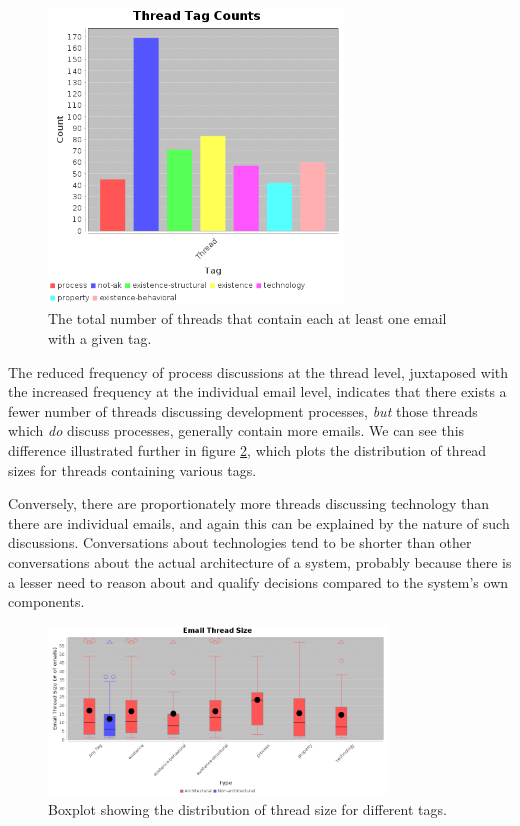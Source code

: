 \documentclass[a4paper, 12pt]{article}
\begin{document}
		\begin{figure}[H]
			\centering
			\includegraphics[width=0.7\textwidth]{report/overview/thread_tag_count.png}
			\caption{The total number of threads that contain each at least one email with a given tag.}
			\label{fig:threadtagcount}
		\end{figure}
	
		The reduced frequency of process discussions at the thread level, juxtaposed with the increased frequency at the individual email level, indicates that there exists a fewer number of threads discussing development processes, \textit{but} those threads which \textit{do} discuss processes, generally contain more emails. We can see this difference illustrated further in figure \ref{fig:threadsize}, which plots the distribution of thread sizes for threads containing various tags.
		
		Conversely, there are proportionately more threads discussing technology than there are individual emails, and again this can be explained by the nature of such discussions. Conversations about technologies tend to be shorter than other conversations about the actual architecture of a system, probably because there is a lesser need to reason about and qualify decisions compared to the system's own components.
		
		\begin{figure}[H]
			\centering
			\includegraphics[width=0.8\textwidth]{report/characteristics/thread_size.png}
			\caption{Boxplot showing the distribution of thread size for different tags.}
			\label{fig:threadsize}
		\end{figure}
	
\end{document}
